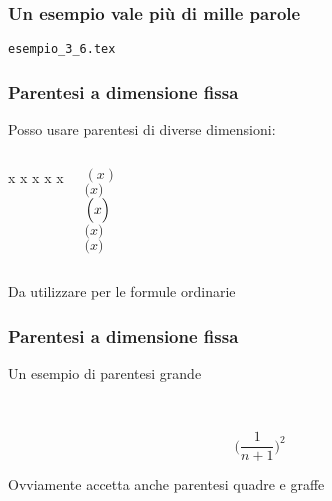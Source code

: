 \begin{frame}
  \frametitle{Un esempio vale pi\`u di mille parole}
	\begin{center}
		\alert{\texttt{esempio\_3\_6.tex}}
	\end{center}
\end{frame}
\begin{frame}
  \frametitle{Parentesi a dimensione fissa}
	Posso usare parentesi di diverse dimensioni:
  \begin{columns}
	\begin{LaTeXcode}
		\LCmd[]{(} x \LCmd[]{)}\n
		 x \vspace{1.1ex}\n
		 x \vspace{2.2ex}\n
		 x \vspace{3ex}\n
		 x \n
	\end{LaTeXcode}
	\begin{LaTeXoutput}
		$( x )$\\
		$\bigl( x\bigr)$\\
		$\Bigl( x \Bigr) $\\
		$\biggr( x \biggr) $\\
		$\Biggr( x \Biggr)$
	\end{LaTeXoutput}
  \end{columns}
  \bigskip
	Da utilizzare per le formule ordinarie
\end{frame}
\begin{frame}
  \frametitle{Parentesi a dimensione fissa}
	Un esempio di parentesi grande
	\begin{LaTeXcode}
		\\[\n
		 \hspace*{5ex}\alert{\\Biggl(}\\frac\{1\}\{n+1\}\alert{\\Biggr)}\textasciicircum 2\n
		\\]
	\end{LaTeXcode}
	\begin{LaTeXoutput}
		\[
			\Biggl(\frac{1}{n+1}\Biggr)^2
		\]
	\end{LaTeXoutput}
	Ovviamente  accetta anche parentesi quadre e graffe
\end{frame}
